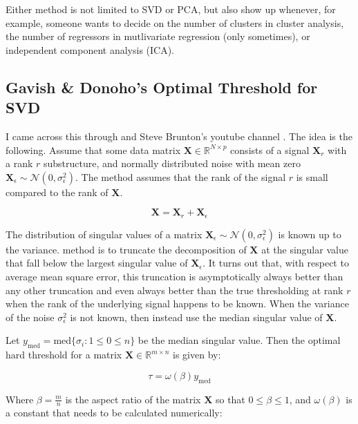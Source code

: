 Either method is not limited to SVD or PCA, but also show up whenever, for example, someone wants to decide on the number of clusters in cluster analysis, the number of regressors in mutlivariate regression (only sometimes), or independent component analysis (ICA).


\subsection{Gavish \& Donoho's Optimal Threshold for SVD}

I came across this through  and Steve Brunton's youtube channel \cite{stevebrunton}. The idea is the following. Assume that some data matrix $\mathbf{X}\in\mathbb{R}^{N \times p}$ consists of a signal $\mathbf{X}_{r}$ with a rank $r$ substructure, and normally distributed noise with mean zero $\mathbf{X}_{\epsilon}\sim \mathscr{N}(0,\sigma_{\epsilon}^2)$. The method assumes that the rank of the signal $r$ is small compared to the rank of $\mathbf{X}$. 

\begin{equation}
\mathbf{X} = \mathbf{X}_r + \mathbf{X}_{\epsilon}
\end{equation}

The distribution of singular values of a matrix $\mathbf{X}_{\epsilon}\sim \mathscr{N}(0,\sigma_{\epsilon}^2)$ is known up to the variance.  method is to truncate the decomposition of $\mathbf{X}$ at the singular value that fall below the largest singular value of $\mathbf{X}_{\epsilon}$. It turns out that, with respect to average mean square error, this truncation is asymptotically always better than any other truncation and even always better than the true thresholding at rank $r$ when the rank of the underlying signal happens to be known. When the variance of the noise $\sigma^2_{\epsilon}$ is not known, then  instead use the median singular value of $\mathbf{X}$. 

Let $y_{\mathrm{med}} = \mathrm{med}\{\sigma_i: 1\leq0\leq n\}$ be the median singular value. Then the optimal hard threshold for a matrix $\mathbf{X}\in\mathbb{R}^{m \times n}$ is given by:

\begin{equation}
\tau = \omega(\beta) y_{\mathrm{med}}
\end{equation}

Where $\beta= \frac{m}{n}$ is the aspect ratio of the matrix $\mathbf{X}$ so that $0\leq \beta \leq 1$,  and $\omega(\beta)$ is a constant that needs to be calculated numerically:

